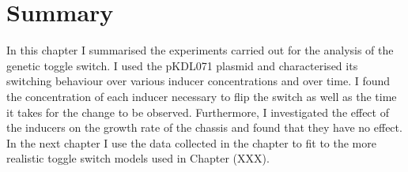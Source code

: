\section{Summary}


In this chapter I summarised the experiments carried out for the analysis of the genetic toggle switch. I used the pKDL071 plasmid and characterised its switching behaviour over various inducer concentrations and over time. I found the concentration of each inducer necessary to flip the switch as well as the time it takes for the change to be observed. Furthermore, I investigated the effect of the inducers on the growth rate of the chassis and found that they have no effect. In the next chapter I use the data collected in the chapter to fit to the more realistic toggle switch models used in Chapter (XXX). 




